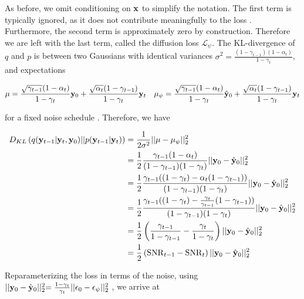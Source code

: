 \documentclass{article}
\begin{document}
As before, we omit conditioning on $\bold{x}$ to simplify the notation. The first term is typically ignored, as it does not contribute meaningfully to the loss \citep{Ribeiro2024}. Furthermore, the second term is approximately zero by construction. Therefore we are left with the last term, called the diffusion loss $\mathcal{L}_{\psi}$. The KL-divergence of $q$ and $p$ is between two Gaussians with identical variances $\sigma^{2} = \frac{(1-\gamma_{t-1})(1-\alpha_{t})}{1-\gamma_{t}}$, and expectations

\begin{align*}
\mu = \frac{\sqrt{\gamma_{t-1}}(1-\alpha_{t})}{1-\gamma_{t}}\bold{y}_{0}+ \frac{\sqrt{\alpha_{t}}(1-\gamma_{t-1})}{{1-\gamma_{t}}}\bold{y}_{t} \quad \mu_{\psi} = \frac{\sqrt{\gamma_{t-1}}(1-\alpha_{t})}{1-\gamma_{t}}\hat{\bold{y}}_{0}+ \frac{\sqrt{\alpha_{t}}(1-\gamma_{t-1})}{{1-\gamma_{t}}}\bold{y}_{t}
\end{align*}

for a fixed noise schedule \citep{Saharia2021}. Therefore, we have

\begin{align*}
D_{KL}\left(q(\bold{y}_{t-1}|\bold{y}_t,\bold{y}_0)\lvert\lvert p(\bold{y}_{t-1}|\bold{y}_t) \right) &= \frac{1}{2\sigma^{2}} \lvert\lvert \mu - \mu_{\psi} \lvert\lvert_{2}^{2} \\
&= \frac{1}{2}\frac{\gamma_{t-1}(1-\alpha_{t})}{(1-\gamma_{t-1})(1-\gamma_{t})}\lvert\lvert \bold{y}_{0} - \hat{\bold{y}}_{0} \lvert\lvert_{2}^{2}\\
&= \frac{1}{2}\frac{\gamma_{t-1}((1-\gamma_{t})-\alpha_{t}(1-\gamma_{t-1}))}{(1-\gamma_{t-1})(1-\gamma_{t})}\lvert\lvert \bold{y}_{0} - \hat{\bold{y}}_{0} \lvert\lvert_{2}^{2}\\
&= \frac{1}{2}\frac{\gamma_{t-1}((1-\gamma_{t})-\frac{\gamma_{t}}{\gamma_{t-1}}(1-\gamma_{t-1}))}{(1-\gamma_{t-1})(1-\gamma_{t})}\lvert\lvert \bold{y}_{0} - \hat{\bold{y}}_{0} \lvert\lvert_{2}^{2}\\
&= \frac{1}{2}\left(\frac{\gamma_{t-1}}{1-\gamma_{t-1}}-\frac{\gamma_{t}}{1-\gamma_{t}}\right)\lvert\lvert \bold{y}_{0} - \hat{\bold{y}}_{0} \lvert\lvert_{2}^{2}\\
&= \frac{1}{2}\left(\mathrm{SNR}_{t-1}-\mathrm{SNR}_{t}\right)\lvert\lvert \bold{y}_{0} - \hat{\bold{y}}_{0} \lvert\lvert_{2}^{2}
\end{align*}

Reparameterizing the loss in terms of the noise, using $\lvert\lvert \bold{y}_{0} - \hat{\bold{y}}_{0} \lvert\lvert_{2}^{2} = \frac{1-\gamma_{t}}{\gamma_{t}}\lvert\lvert \bold{\epsilon}_{0} - \epsilon_{\psi} \lvert\lvert_{2}^{2}$ \citep{Ribeiro2024}, we arrive at 
\end{document}
